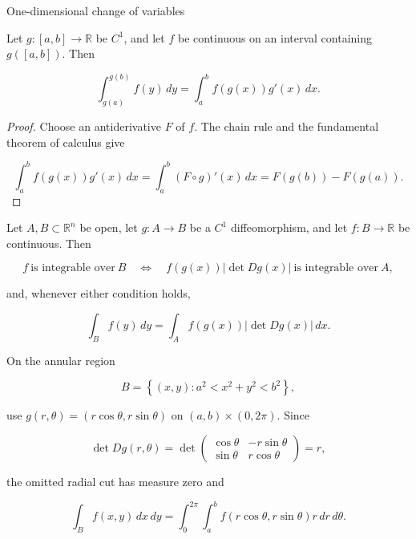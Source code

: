 \begin{theorem}{One-dimensional change of variables}

Let \(g:\left\lbrack {a,b} \right\rbrack\rightarrow\mathbb{R}\) be \(C^{1}\), and let \(f\) be continuous on an interval containing \(g\left( \left\lbrack {a,b} \right\rbrack \right)\). Then

\[\int_{g{(a)}}^{g{(b)}}f(y)\, dy = \int_{a}^{b}f\left( {g(x)} \right)g'(x)\, dx.\]

\end{theorem}

\begin{proof}

Choose an antiderivative \(F\) of \(f\). The chain rule and the fundamental theorem of calculus give

\[\int_{a}^{b}f\left( {g(x)} \right)g'(x)\, dx = \int_{a}^{b}\left( {F \circ g} \right)'(x)\, dx = F\left( {g(b)} \right) - F\left( {g(a)} \right).\]

\end{proof}

\begin{theorem}{}

Let \(A,B \subset \mathbb{R}^{n}\) be open, let \(g:A\rightarrow B\) be a \(C^{1}\) diffeomorphism, and let \(f:B\rightarrow\mathbb{R}\) be continuous. Then

\[f\ \text{is integrable over}\ B\quad\Leftrightarrow\quad f\left( {g(x)} \right)\left| {\det Dg(x)} \right|\ \text{is integrable over}\ A,\]

and, whenever either condition holds,

\[\int_{B}f(y)\, dy = \int_{A}f\left( {g(x)} \right)\left| {\det Dg(x)} \right|\, dx.\]

\end{theorem}

\begin{example}

On the annular region

\[B = \left\{ {\left( {x,y} \right):a^{2} < x^{2} + y^{2} < b^{2}} \right\},\]

use \(g\left( {r,\theta} \right) = \left( {r\cos\theta,r\sin\theta} \right)\) on \(\left( {a,b} \right) \times \left( {0,2\pi} \right)\). Since

\[\det Dg\left( {r,\theta} \right) = \det\begin{pmatrix}
{\cos\theta} & {- r\sin\theta} \\
{\sin\theta} & {r\cos\theta}
\end{pmatrix} = r,\]

the omitted radial cut has measure zero and

\[\int_{B}f\left( {x,y} \right)\, dx\, dy = \int_{0}^{2\pi}\int_{a}^{b}f\left( {r\cos\theta,r\sin\theta} \right)r\, dr\, d\theta.\]

\end{example}

